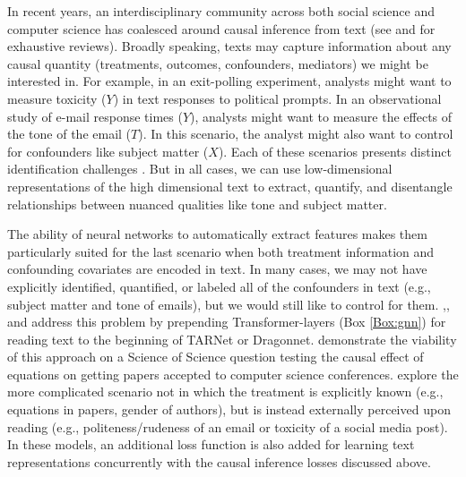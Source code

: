 In recent years, an interdisciplinary community across both social science and computer science has coalesced around causal inference from text (see \citet{keith-etal-2020-text} and \citet{feder2021causal} for exhaustive reviews). Broadly speaking, texts may capture information about any causal quantity (treatments, outcomes, confounders, mediators) we might be interested in. For example, in an exit-polling experiment, analysts might want to measure toxicity ($Y$) in text responses to political prompts. In an observational study of e-mail response times ($Y$), analysts might want to measure the effects of the tone of the email ($T$). In this scenario, the analyst might also want to control for confounders like subject matter ($X$). Each of these scenarios presents distinct identification challenges \citep{feder2021causal}. But in all cases, we can use low-dimensional representations of the high dimensional text to extract, quantify, and disentangle relationships between nuanced qualities like tone and subject matter. %

The ability of neural networks to automatically extract features makes them particularly suited for the last scenario when both treatment information and confounding covariates are encoded in text. In many cases, we may not have explicitly identified, quantified, or labeled all of the confounders in text (e.g., subject matter and tone of emails), but we would still like to control for them. \citet{pryzant2020causal},\citet{Veitch2019UsingTE}, and \citet{gui2022causal} address this problem by prepending Transformer-layers (Box \ref{Box:gnn}) for reading text to the beginning of TARNet or Dragonnet. \citet{Veitch2019UsingTE} demonstrate the viability of this approach on a Science of Science question testing the causal effect of equations on getting papers accepted to computer science conferences. \citet{pryzant2020causal,gui2022causal} explore the more complicated scenario not in which the treatment is explicitly known (e.g., equations in papers, gender of authors), but is instead externally perceived upon reading (e.g., politeness/rudeness of an email or toxicity of a social media post). In these models, an additional loss function is also added for learning text representations concurrently with the causal inference losses discussed above. 

